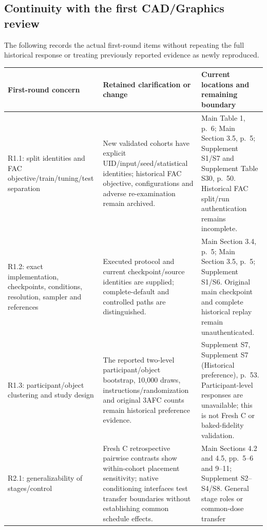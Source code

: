 \documentclass[
  10pt,
]{article}
\begin{document}
\hypertarget{continuity-with-the-first-cadgraphics-review}{%
\subsection{Continuity with the first CAD/Graphics
review}\label{continuity-with-the-first-cadgraphics-review}}

The following records the actual first-round items without repeating the
full historical response or treating previously reported evidence as
newly reproduced.

\begin{longtable}[]{@{}
  >{\raggedright\arraybackslash}p{}
  >{\raggedright\arraybackslash}p{}
  >{\raggedright\arraybackslash}p{}@{}}
\toprule
First-round concern & Retained clarification or change & Current
locations and remaining boundary \\
\midrule
\endhead
R1.1: split identities and FAC objective/train/tuning/test separation &
New validated cohorts have explicit UID/input/seed/statistical
identities; historical FAC objective, configurations and adverse
re-examination remain archived. & Main Table 1, p.~6; Main Section 3.5,
p.~5; Supplement S1/S7 and Supplement Table S30, p.~50. Historical FAC
split/run authentication remains incomplete. \\
R1.2: exact implementation, checkpoints, conditions, resolution, sampler
and references & Executed protocol and current checkpoint/source
identities are supplied; complete-default and controlled paths are
distinguished. & Main Section 3.4, p.~5; Main Section 3.5, p.~5;
Supplement S1/S6. Original main checkpoint and complete historical
replay remain unauthenticated. \\
R1.3: participant/object clustering and study design & The reported
two-level participant/object bootstrap, 10,000 draws,
instructions/randomization and original 3AFC counts remain historical
preference evidence. & Supplement S7, Supplement S7 (Historical
preference), p.~53. Participant-level responses are unavailable; this is
not Fresh C or baked-fidelity validation. \\
R2.1: generalizability of stages/control & Fresh C retrospective
pairwise contrasts show within-cohort placement sensitivity; native
conditioning interfaces test transfer boundaries without establishing
common schedule effects. & Main Sections 4.2 and 4.5, pp.~5--6 and
9--11; Supplement S2--S4/S8. General stage roles or common-dose transfer

\end{longtable}
\end{document}
